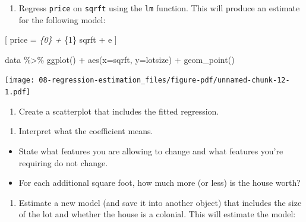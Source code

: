 \documentclass[
  letterpaper,
  DIV=11,
  numbers=noendperiod]{scrreprt}
\newenvironment{Shaded}{\begin{snugshade}}{\end{snugshade}}
\newcommand{\AttributeTok}[1]{\textcolor[rgb]{0.40,0.45,0.13}{#1}}
\newcommand{\FunctionTok}[1]{\textcolor[rgb]{0.28,0.35,0.67}{#1}}
\newcommand{\NormalTok}[1]{\textcolor[rgb]{0.00,0.23,0.31}{#1}}
\newcommand{\SpecialCharTok}[1]{\textcolor[rgb]{0.37,0.37,0.37}{#1}}
\providecommand{\tightlist}{%
  \setlength{\itemsep}{0pt}\setlength{\parskip}{0pt}}\usepackage{longtable,booktabs,array}
\begin{document}
\begin{enumerate}
\def\labelenumi{\arabic{enumi}.}
\setcounter{enumi}{3}
\tightlist
\item
  Regress \texttt{price} on \texttt{sqrft} using the \texttt{lm}
  function. This will produce an estimate for the following model:
\end{enumerate}

{[} price = \beta\emph{\{0\} + \beta}\{1\} sqrft + e {]}

\begin{Shaded}
\begin{Highlighting}[]
\NormalTok{data }\SpecialCharTok{\%\textgreater{}\%} 
  \FunctionTok{ggplot}\NormalTok{() }\SpecialCharTok{+} 
  \FunctionTok{aes}\NormalTok{(}\AttributeTok{x=}\NormalTok{sqrft, }\AttributeTok{y=}\NormalTok{lotsize) }\SpecialCharTok{+} 
  \FunctionTok{geom\_point}\NormalTok{()}
\end{Highlighting}
\end{Shaded}

\texttt{[image: 08-regression-estimation\_files/figure-pdf/unnamed-chunk-12-1.pdf]}

\begin{enumerate}
\def\labelenumi{\arabic{enumi}.}
\setcounter{enumi}{4}
\tightlist
\item
  Create a scatterplot that includes the fitted regression.
\end{enumerate}

\begin{enumerate}
\def\labelenumi{\arabic{enumi}.}
\setcounter{enumi}{5}
\tightlist
\item
  Interpret what the coefficient means.
\end{enumerate}

\begin{itemize}
\tightlist
\item
  State what features you are allowing to change and what features
  you're requiring do not change.
\item
  For each additional square foot, how much more (or less) is the house
  worth?
\end{itemize}

\begin{enumerate}
\def\labelenumi{\arabic{enumi}.}
\setcounter{enumi}{6}
\tightlist
\item
  Estimate a new model (and save it into another object) that includes
  the size of the lot and whether the house is a colonial. This will
  estimate the model:
\end{enumerate}
\end{document}
